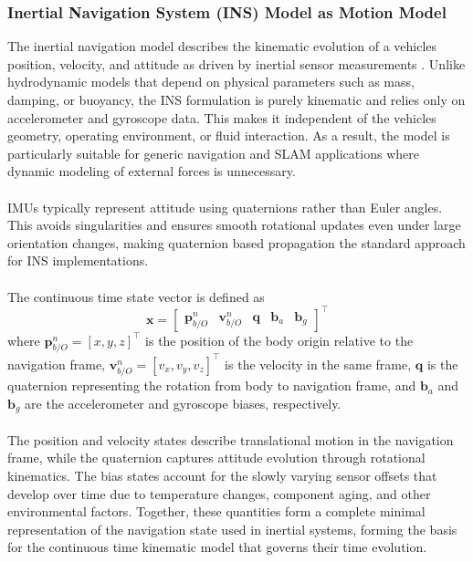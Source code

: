 \subsubsection{Inertial Navigation System (INS) Model as Motion Model}
The inertial navigation model describes the kinematic evolution of a vehicles position, velocity, and attitude as driven by inertial sensor measurements \cite{sensor_fusion_book}. Unlike hydrodynamic models that depend on physical parameters such as mass, damping, or buoyancy, the INS formulation is purely kinematic and relies only on accelerometer and gyroscope data. This makes it independent of the vehicles geometry, operating environment, or fluid interaction. As a result, the model is particularly suitable for generic navigation and SLAM applications where dynamic modeling of external forces is unnecessary.  
\\ \\
IMUs typically represent attitude using quaternions rather than Euler angles. This avoids singularities and ensures smooth rotational updates even under large orientation changes, making quaternion based propagation the standard approach for INS implementations.  
\\ \\
The continuous time state vector is defined as
$$
    \mathbf{x} =
    \begin{bmatrix}
        \mathbf{p}_{b/O}^{n} & \mathbf{v}_{b/O}^{n} & \mathbf{q} & \mathbf{b}_a & \mathbf{b}_g
    \end{bmatrix}^\top
$$
where $\mathbf{p}_{b/O}^{n} = [x, y, z]^\top$ is the position of the body origin relative to the navigation frame, $\mathbf{v}_{b/O}^{n} = [v_x, v_y, v_z]^\top$ is the velocity in the same frame, $\mathbf{q}$ is the quaternion representing the rotation from body to navigation frame, and $\mathbf{b}_a$ and $\mathbf{b}_g$ are the accelerometer and gyroscope biases, respectively.  
\\ \\
The position and velocity states describe translational motion in the navigation frame, while the quaternion captures attitude evolution through rotational kinematics. The bias states account for the slowly varying sensor offsets that develop over time due to temperature changes, component aging, and other environmental factors. Together, these quantities form a complete minimal representation of the navigation state used in inertial systems, forming the basis for the continuous time kinematic model that governs their time evolution.  
\\ \\
